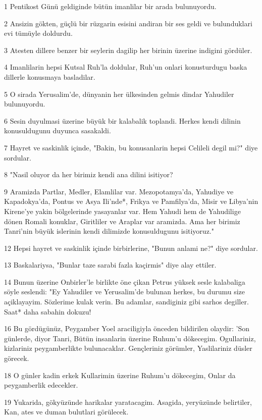 \par 1 Pentikost Günü geldiginde bütün imanlilar bir arada bulunuyordu.
\par 2 Ansizin gökten, güçlü bir rüzgarin esisini andiran bir ses geldi ve bulunduklari evi tümüyle doldurdu.
\par 3 Atesten dillere benzer bir seylerin dagilip her birinin üzerine indigini gördüler.
\par 4 Imanlilarin hepsi Kutsal Ruh'la doldular, Ruh'un onlari konusturdugu baska dillerle konusmaya basladilar.
\par 5 O sirada Yerusalim'de, dünyanin her ülkesinden gelmis dindar Yahudiler bulunuyordu.
\par 6 Sesin duyulmasi üzerine büyük bir kalabalik toplandi. Herkes kendi dilinin konusuldugunu duyunca sasakaldi.
\par 7 Hayret ve saskinlik içinde, "Bakin, bu konusanlarin hepsi Celileli degil mi?" diye sordular.
\par 8 "Nasil oluyor da her birimiz kendi ana dilini isitiyor?
\par 9 Aramizda Partlar, Medler, Elamlilar var. Mezopotamya'da, Yahudiye ve Kapadokya'da, Pontus ve Asya Ili'nde*, Frikya ve Pamfilya'da, Misir ve Libya'nin Kirene'ye yakin bölgelerinde yasayanlar var. Hem Yahudi hem de Yahudilige dönen Romali konuklar, Giritliler ve Araplar var aramizda. Ama her birimiz Tanri'nin büyük islerinin kendi dilimizde konusuldugunu isitiyoruz."
\par 12 Hepsi hayret ve saskinlik içinde birbirlerine, "Bunun anlami ne?" diye sordular.
\par 13 Baskalariysa, "Bunlar taze sarabi fazla kaçirmis" diye alay ettiler.
\par 14 Bunun üzerine Onbirler'le birlikte öne çikan Petrus yüksek sesle kalabaliga söyle seslendi: "Ey Yahudiler ve Yerusalim'de bulunan herkes, bu durumu size açiklayayim. Sözlerime kulak verin. Bu adamlar, sandiginiz gibi sarhos degiller. Saat* daha sabahin dokuzu!
\par 16 Bu gördügünüz, Peygamber Yoel araciligiyla önceden bildirilen olaydir: 'Son günlerde, diyor Tanri, Bütün insanlarin üzerine Ruhum'u dökecegim. Ogullariniz, kizlariniz peygamberlikte bulunacaklar. Gençleriniz görümler, Yaslilariniz düsler görecek.
\par 18 O günler kadin erkek Kullarimin üzerine Ruhum'u dökecegim, Onlar da peygamberlik edecekler.
\par 19 Yukarida, gökyüzünde harikalar yaratacagim. Asagida, yeryüzünde belirtiler, Kan, ates ve duman bulutlari görülecek.
